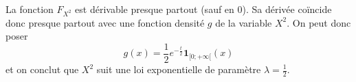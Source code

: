 {\begin{enumerate}
{La fonction $F_{X^2}$ est dérivable presque partout (sauf en ${0}$). Sa dérivée coïncide donc presque partout avec une fonction densité $g$ de la variable $X^2$. On peut donc poser 
$$g(x)=\frac{1}{2}e^{-\frac{t}{2}}\textbf{1}_{[0;+\infty[}(x)$$
et on conclut que $X^2$ suit une loi exponentielle de paramètre $\lambda = \frac{1}{2}$.		
 		}
\end{enumerate}}
